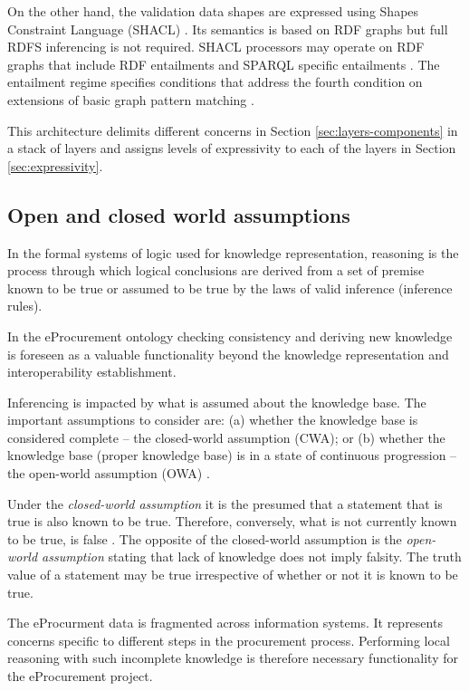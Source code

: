 	On the other hand, the validation data shapes are expressed using Shapes Constraint Language (SHACL) \cite{shacl-spec}. Its semantics is based on RDF graphs but full RDFS inferencing is not required. SHACL processors may operate on RDF graphs that include RDF entailments \citep{rdf11-semantics} and SPARQL specific entailments \citep{sparql11-entailment}. The entailment regime specifies conditions that address the fourth condition on extensions of basic graph pattern matching \citep{rdf-semantics,rdf11-semantics}. 
	
	This architecture delimits different concerns in Section \ref{sec:layers-components} in a stack of layers and assigns levels of expressivity to each of the layers in Section \ref{sec:expressivity}.
	
	\subsection{Open and closed world assumptions}
	\label{sec:world-assumption}
	
	In the formal systems of logic used for knowledge representation, reasoning is the process through which logical conclusions are derived from a set of premise known to be true or assumed to be true by the laws of valid inference (inference rules). 
	
	In the eProcurement ontology checking consistency and deriving new knowledge is foreseen as a valuable functionality beyond the knowledge representation and interoperability establishment.
	
	Inferencing is impacted by what is assumed about the knowledge base. The important assumptions to consider are: (a) whether the knowledge base is considered complete -- the closed-world assumption (CWA); or (b) whether the knowledge base (proper knowledge base) is in a state of continuous progression -- the open-world assumption (OWA) \cite{damasio2006supporting}.
	
	Under the \textit{closed-world assumption} it is the presumed that a statement that is true is also known to be true. Therefore, conversely, what is not currently known to be true, is false \citep{reiter1981closed}.
	The opposite of the closed-world assumption is the \textit{open-world assumption} stating that lack of knowledge does not imply falsity. The truth value of a statement may be true irrespective of whether or not it is known to be true. 
		
	The eProcurment data is fragmented across information systems. It represents concerns specific to different steps in the procurement process. Performing local reasoning with such incomplete knowledge is therefore necessary functionality for the eProcurement project. 
		
